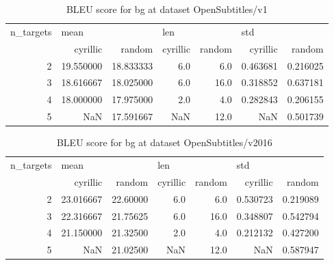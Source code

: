 \begin{table}[h]
\begin{tabular}{rrrrrrr}
\toprule
n\_targets & \multicolumn{2}{l}{mean} & \multicolumn{2}{l}{len} & \multicolumn{2}{l}{std} \\
          &   cyrillic &     random & cyrillic & random &  cyrillic &    random \\
\midrule
        2 &  19.550000 &  18.833333 &      6.0 &    6.0 &  0.463681 &  0.216025 \\
        3 &  18.616667 &  18.025000 &      6.0 &   16.0 &  0.318852 &  0.637181 \\
        4 &  18.000000 &  17.975000 &      2.0 &    4.0 &  0.282843 &  0.206155 \\
        5 &        NaN &  17.591667 &      NaN &   12.0 &       NaN &  0.501739 \\
\bottomrule
\end{tabular}

\caption{BLEU score for  bg at dataset OpenSubtitles/v1 }
\label{ table:bg/OpenSubtitles/v1 }
\end{table}

\begin{table}[h]
\begin{tabular}{rrrrrrr}
\toprule
n\_targets & \multicolumn{2}{l}{mean} & \multicolumn{2}{l}{len} & \multicolumn{2}{l}{std} \\
          &   cyrillic &    random & cyrillic & random &  cyrillic &    random \\
\midrule
        2 &  23.016667 &  22.60000 &      6.0 &    6.0 &  0.530723 &  0.219089 \\
        3 &  22.316667 &  21.75625 &      6.0 &   16.0 &  0.348807 &  0.542794 \\
        4 &  21.150000 &  21.32500 &      2.0 &    4.0 &  0.212132 &  0.427200 \\
        5 &        NaN &  21.02500 &      NaN &   12.0 &       NaN &  0.587947 \\
\bottomrule
\end{tabular}

\caption{BLEU score for  bg at dataset OpenSubtitles/v2016 }
\label{ table:bg/OpenSubtitles/v2016 }
\end{table}

